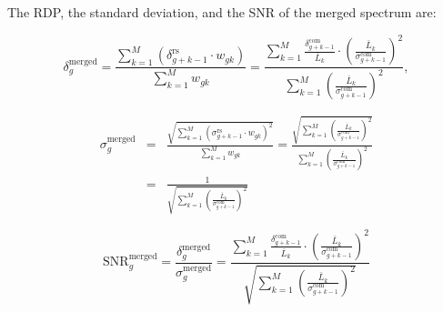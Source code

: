 \documentclass[%
reprint, %
superscriptaddress,
 amsmath,amssymb,
 aps
]{revtex4-2}
\begin{document}
The RDP, the standard deviation, and the SNR of the merged spectrum are:

\begin{equation}
    \delta_{g}^\text{merged} = \frac{ \sum\limits_{k = 1}^{M}\left(\delta_{g+k-1}^\text{rs} \cdot {w_{gk}}\right)}{\sum\limits_{k = 1}^{M} {w_{gk}}} = \frac{\sum\limits_{k = 1}^{M}\frac{\delta_{g+k-1}^\text{com}}{\bar{L}_{k}} \cdot \left(\frac{\bar{L}_{k}}{\sigma_{g+k-1}^\text{com}}\right)^2} {\sum\limits_{k = 1}^{M}\left(\frac{\bar{L}_{k}}{\sigma_{g+k-1}^\text{com}}\right)^2},
    \label{eq:merged_power}
\end{equation}

\begin{eqnarray}
  \sigma_{g}^\text{merged} & =  & \frac{ \sqrt{\sum\limits_{k = 1}^{M} \left(\sigma_{g+k-1}^\text{rs} \cdot {w_{gk}}\right)^2}}{\sum\limits_{k = 1}^{M} {w_{gk}}} = \frac{\sqrt{\sum\limits_{k = 1}^{M} \left(\frac{\bar{L}_{k}}{\sigma_{g+k-1}^\text{com}}\right)^2}}{\sum\limits_{k = 1}^{M} \left(\frac{\bar{L}_{k}}{\sigma_{g+k-1}^\text{com}}\right)^2}  \nonumber \\
    & = & \frac{1}{\sqrt{\sum\limits_{k = 1}^{M} \left(\frac{\bar{L}_{k}}{\sigma_{g+k-1}^\text{com}}\right)^2}}
    \label{eq:merged_sigma}
\end{eqnarray}

\begin{equation}
    \label{eq:merged_snr}
    \text{SNR}_{g}^\text{merged} = \frac{\delta^\text{merged}_{g}}{\sigma^\text{merged}_{g}} = \frac{\sum\limits_{k = 1}^{M}\frac{\delta_{g+k-1}^\text{com}}{\bar{L}_{k}} \cdot \left(\frac{\bar{L}_{k}}{\sigma_{g+k-1}^\text{com}}\right)^2}{\sqrt{\sum\limits_{k = 1}^{M} \left(\frac{\bar{L}_{k}}{\sigma_{g+k-1}^\text{com}}\right)^2}}
\end{equation}
\end{document}
